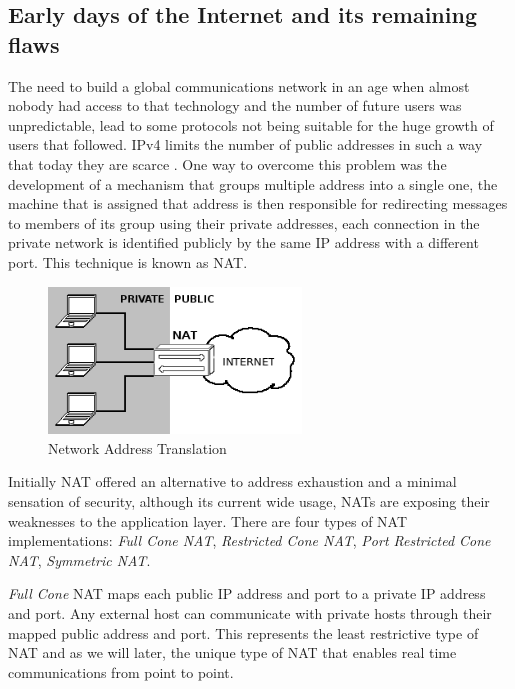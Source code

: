 \subsection{Early days of the Internet and its remaining flaws}\label{early}

The need to build a global communications network in an age when almost nobody had access to that technology and the number of future users was unpredictable, lead to some protocols not being suitable for the huge growth of users that followed. \ac{IPv4} limits the number of public addresses in such a way that today they are scarce \cite{ipv4}. One way to overcome this problem was the development of a mechanism that groups multiple address into a single one, the machine that is assigned that address is then responsible for redirecting messages to members of its group using their private addresses, each connection in the private network is identified publicly by the same \ac{IP} address with a different port.
This technique is known as \ac{NAT}.

\begin{figure}[H]
	\centering
	\includegraphics[width=0.6\textwidth]{figures/nat.png}
	\caption{Network Address Translation}
\end{figure}

Initially \ac{NAT} offered an alternative to address exhaustion and a minimal sensation of security, although its current wide usage, \ac{NAT}s are exposing their weaknesses to the application layer.
There are four types of \ac{NAT} implementations\cite{rfc3489}: \emph{Full Cone NAT}, \emph{Restricted Cone NAT}, \emph{Port Restricted Cone NAT}, \emph{Symmetric NAT}.

\emph{Full Cone} \ac{NAT} maps each public \ac{IP} address and port to a private \ac{IP} address and port.
Any external host can communicate with private hosts through their mapped public address and port. This represents the least restrictive type of \ac{NAT} and as we will later, the unique type of \ac{NAT} that enables real time communications from point to point.

